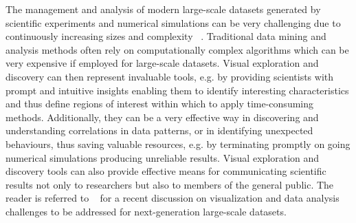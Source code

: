 \documentclass[1p]{elsarticle}
\begin{document}
The management and analysis of modern large-scale datasets generated by scientific experiments and numerical simulations can be very challenging due to continuously increasing sizes and complexity ~\cite{DataTsunami}. Traditional data mining and analysis methods often rely on computationally complex
algorithms which can be very expensive if employed for 
large-scale datasets. Visual exploration and discovery can then represent invaluable tools, e.g. by providing scientists with prompt and intuitive insights enabling them to identify interesting characteristics and thus define regions of interest within which
to apply time-consuming methods. Additionally, they can be a very effective way in discovering and understanding correlations in data patterns, or in identifying unexpected behaviours, thus saving valuable resources, e.g. by terminating promptly on going numerical simulations producing unreliable results. Visual exploration and discovery tools can also provide effective means for communicating scientific results not only to researchers but also to members of the general public. The reader is referred to ~\cite{DAV} for a recent discussion on visualization and data analysis challenges to be addressed for next-generation large-scale datasets.
\end{document}
